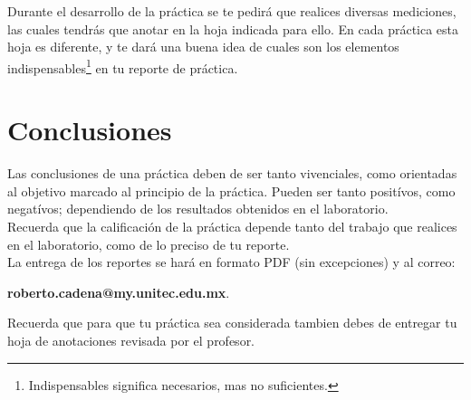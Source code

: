     Durante el desarrollo de la práctica se te pedirá que realices diversas mediciones, las cuales tendrás que anotar en la hoja indicada para ello. En cada práctica esta hoja es diferente, y te dará una buena idea de cuales son los elementos indispensables\footnote{Indispensables significa necesarios, mas no suficientes.} en tu reporte de práctica. \\


\section{Conclusiones}
	Las conclusiones de una práctica deben de ser tanto vivenciales, como orientadas al objetivo marcado al principio de la práctica. Pueden ser tanto positívos, como negatívos; dependiendo de los resultados obtenidos en el laboratorio. \\

	Recuerda que la calificación de la práctica depende tanto del trabajo que realices en el laboratorio, como de lo preciso de tu reporte. \\

	La entrega de los reportes se hará en formato PDF (sin excepciones) y al correo:

	\begin{center}
		\textbf{roberto.cadena@my.unitec.edu.mx}. \\
	\end{center}

	Recuerda que para que tu práctica sea considerada tambien debes de entregar tu hoja de anotaciones revisada por el profesor.



